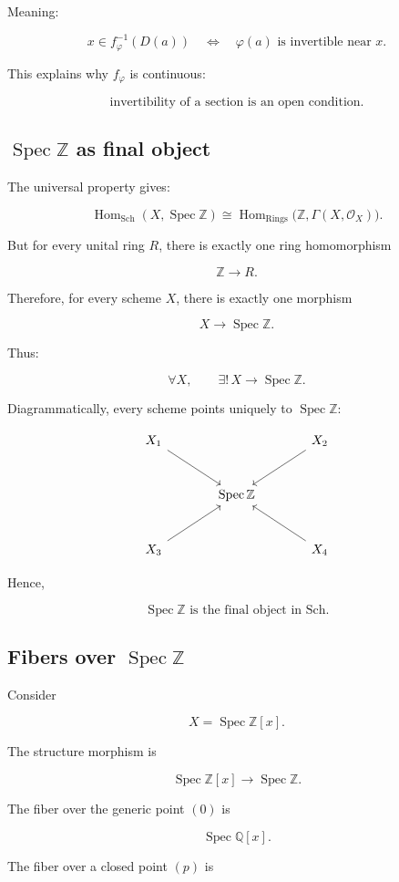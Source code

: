 \documentclass[12pt,a4paper]{article}
\DeclareMathOperator{\Hom}{Hom}
\newcommand{\ZZ}{\mathbb Z}
\newcommand{\OO}{\mathcal{O}}
\newcommand{\Spec}{\operatorname{Spec}}
\newcommand{\Sch}{\mathrm{Sch}}
\newcommand{\Rings}{\mathrm{Rings}}
\theoremstyle{notespace}
\begin{document}
Meaning:

\[
\boxed{
	x\in f_\varphi^{-1}(D(a))
	\quad\Longleftrightarrow\quad
	\varphi(a)\text{ is invertible near }x.
}
\]

This explains why \(f_\varphi\) is continuous:

\[
\boxed{
	\text{invertibility of a section is an open condition.}
}
\]

\subsection{\(\Spec\ZZ\) as final object}

The universal property gives:

\[
\Hom_{\Sch}(X,\Spec\ZZ)
\cong
\Hom_{\Rings}\bigl(\ZZ,\Gamma(X,\OO_X)\bigr).
\]

But for every unital ring \(R\), there is exactly one ring homomorphism

\[
\ZZ\to R.
\]

Therefore, for every scheme \(X\), there is exactly one morphism

\[
X\to\Spec\ZZ.
\]

Thus:

\[
\boxed{
	\forall X,\qquad \exists!\, X\to\Spec\ZZ.
}
\]

Diagrammatically, every scheme points uniquely to \(\Spec\ZZ\):

\[
\begin{tikzcd}[column sep=large,row sep=large]
	X_1 \arrow[dr] && X_2 \arrow[dl] \\
	& \Spec\ZZ & \\
	X_3 \arrow[ur] && X_4 \arrow[ul]
\end{tikzcd}
\]

Hence,

\[
\boxed{
	\Spec\ZZ
	\text{ is the final object in }\Sch.
}
\]

\subsection{Fibers over \(\Spec\ZZ\)}

Consider

\[
X=\Spec\ZZ[x].
\]

The structure morphism is

\[
\Spec\ZZ[x]\to\Spec\ZZ.
\]

The fiber over the generic point \((0)\) is

\[
\Spec\mathbb Q[x].
\]

The fiber over a closed point \((p)\) is
\end{document}
